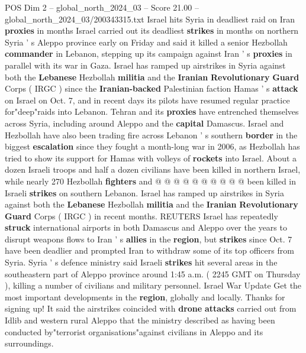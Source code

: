 \begin{textsample}{POS Dim 2 – global\_north\_2024\_03 – Score 21.00 – global\_north\_2024\_03/200343315.txt}  \label{ex:f2_pos_362}
Israel hits Syria in deadliest raid on Iran \textbf{proxies} in months Israel carried out its deadliest \textbf{strikes} in months on northern Syria ' s Aleppo province early on Friday and said it killed a senior Hezbollah \textbf{commander} in Lebanon, stepping up its campaign against Iran ' s \textbf{proxies} in parallel with its war in Gaza.
Israel has ramped up airstrikes in Syria against both the \textbf{Lebanese} Hezbollah \textbf{militia} and the \textbf{Iranian} \textbf{Revolutionary} \textbf{Guard} Corps ( IRGC ) since the \textbf{Iranian-backed} Palestinian faction Hamas ' s \textbf{attack} on Israel on Oct. 7, and in recent days its pilots have resumed regular practice for"deep"raids into Lebanon.
Tehran and its \textbf{proxies} have entrenched themselves across Syria, including around Aleppo and the \textbf{capital} Damascus.
Israel and Hezbollah have also been trading fire across Lebanon ' s southern \textbf{border} in the biggest \textbf{escalation} since they fought a month-long war in 2006, as Hezbollah has tried to show its support for Hamas with volleys of \textbf{rockets} into Israel.
About a dozen Israeli troops and half a dozen civilians have been killed in northern Israel, while nearly 270 Hezbollah \textbf{fighters} and @ @ @ @ @ @ @ @ @ @ been killed in Israeli \textbf{strikes} on southern Lebanon.
Israel has ramped up airstrikes in Syria against both the \textbf{Lebanese} Hezbollah \textbf{militia} and the \textbf{Iranian} \textbf{Revolutionary} \textbf{Guard} Corps ( IRGC ) in recent months.
REUTERS Israel has repeatedly \textbf{struck} international airports in both Damascus and Aleppo over the years to disrupt weapons flows to Iran ' s \textbf{allies} in the \textbf{region}, but \textbf{strikes} since Oct. 7 have been deadlier and prompted Iran to withdraw some of its top officers from Syria.
Syria ' s defence ministry said Israeli \textbf{strikes} hit several areas in the southeastern part of Aleppo province around 1:45 a.m. ( 2245 GMT on Thursday ), killing a number of civilians and military personnel.
Israel War Update Get the most important developments in the \textbf{region}, globally and locally.
Thanks for signing up!
It said the airstrikes coincided with \textbf{drone} \textbf{attacks} carried out from Idlib and western rural Aleppo that the ministry described as having been conducted by"terrorist organisations"against civilians in Aleppo and its surroundings.

\end{textsample}
